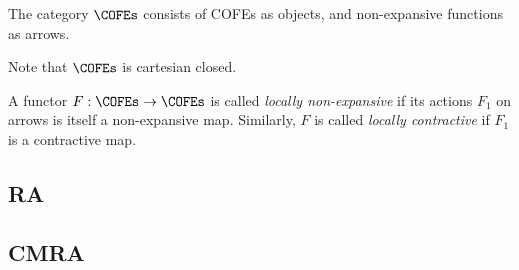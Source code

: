 \begin{defn}
  The category $\COFEs$ consists of COFEs as objects, and non-expansive functions as arrows.
\end{defn}
Note that $\COFEs$ is cartesian closed.

\begin{defn}
  A functor $F : \COFEs \to \COFEs$ is called \emph{locally non-expansive} if its actions $F_1$ on arrows is itself a non-expansive map.
  Similarly, $F$ is called \emph{locally contractive} if $F_1$ is a contractive map.
\end{defn}

\subsection{RA}


\subsection{CMRA}

